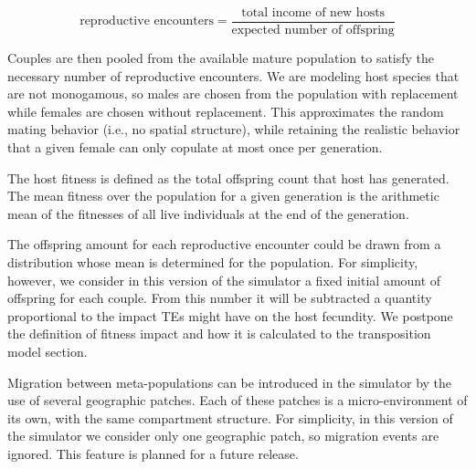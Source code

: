 \documentclass[10pt]{article}
\begin{document}
\begin{equation}
  \label{eq:couples}
  \mbox{reproductive encounters} = 
  \frac{\mbox{total income of new hosts}}
       {\mbox{expected number of offspring}} 
\end{equation}

Couples are then pooled from the available mature population to
satisfy the necessary number of reproductive encounters. We are
modeling host species that are not monogamous, so males are chosen
from the population with replacement while females are chosen without
replacement. This approximates the random mating behavior (i.e., no
spatial structure), while retaining the realistic behavior that a
given female can only copulate at most once per generation.


The host fitness is defined as the total offspring count that host has
generated. The mean fitness over the population for a given generation
is the arithmetic mean of the fitnesses of all live individuals at the
end of the generation.

The offspring amount for each reproductive encounter could be drawn
from a distribution whose mean is determined for the population. For
simplicity, however, we consider in this version of the simulator a
fixed initial amount of offspring for each couple. From this number it
will be subtracted a quantity proportional to the impact TEs might
have on the host fecundity. We postpone the definition of fitness
impact and how it is calculated to the transposition model section.

Migration between meta-populations can be introduced in the simulator
by the use of several geographic patches. Each of these patches is a
micro-environment of its own, with the same compartment structure. For
simplicity, in this version of the simulator we consider only one
geographic patch, so migration events are ignored. This feature is
planned for a future release.

\end{document}
